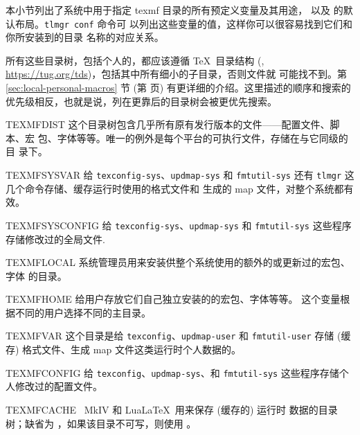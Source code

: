 \documentclass{article}
\begin{document}
本小节列出了系统中用于指定 texmf 目录的所有预定义变量及其用途，
以及 \TL{} 的默认布局。\texttt{tlmgr~conf} 命令可
以列出这些变量的值，这样你可以很容易找到它们和你所安装到的目录
名称的对应关系。

所有这些目录树，包括个人的，都应该遵循 \TeX\ 目录结构 (\TDS,
\url{https://tug.org/tds})，包括其中所有细小的子目录，否则文件就
可能找不到。第 \ref{sec:local-personal-macros} 节 (第
\pageref{sec:local-personal-macros} 页) 有更详细的介绍。这里描述的顺序和搜索的
优先级相反，也就是说，列在更靠后的目录树会被更优先搜索。

\begin{ttdescription}
  \item [TEXMFDIST] 这个目录树包含几乎所有原有发行版本的文件——配置文件、脚本、宏
  包、字体等等。唯一的例外是每个平台的可执行文件，存储在与它同级的  目
  录下。
  \item [TEXMFSYSVAR] 给 \verb+texconfig-sys+、\verb+updmap-sys+ 和
  \verb+fmtutil-sys+ 还有 \verb+tlmgr+ 这几个命令存储、缓存运行时使用的格式文件和
  生成的 map 文件，对整个系统都有效。
  \item [TEXMFSYSCONFIG] 给 \verb+texconfig-sys+、\verb+updmap-sys+ 和
  \verb+fmtutil-sys+ 这些程序存储修改过的全局文件.
  \item [TEXMFLOCAL] 系统管理员用来安装供整个系统使用的额外的或更新过的宏包、字体
  的目录。
  \item [TEXMFHOME] 给用户存放它们自己独立安装的的宏包、字体等等。
  这个变量根据不同的用户选择不同的主目录。
  \item [TEXMFVAR] 这个目录是给 \verb+texconfig+、\verb+updmap-user+ 和
  \verb+fmtutil-user+ 存储 (缓存) 格式文件、生成 map 文件这类运行时个人数据的。
  \item [TEXMFCONFIG] 给 \verb+texconfig+、\verb+updmap-sys+、和 \verb+fmtutil-sys+
  这些程序存储个人修改过的配置文件。
  \item [TEXMFCACHE] \ConTeXt\ MkIV 和 Lua\LaTeX\ 用来保存 (缓存的) 运行时
  数据的目录树；缺省为 ，如果该目录不可写，则使用
  。
\end{ttdescription}
\end{document}
